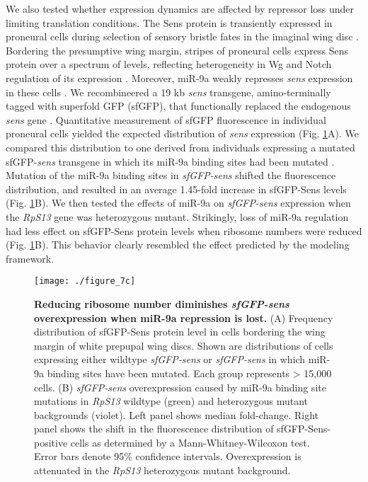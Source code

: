 We also tested whether expression dynamics are affected by repressor loss under limiting translation conditions. The Sens protein is transiently expressed in proneural cells during selection of sensory bristle fates in the imaginal wing disc \cite{Nolo2000}. Bordering the presumptive wing margin, stripes of proneural cells express Sens protein over a spectrum of levels, reflecting heterogeneity in Wg and Notch regulation of its expression \cite{JafarNejad2006,Quan2005}. Moreover, miR-9a weakly represses \textit{sens} expression in these cells \cite{Li2006}. We recombineered a 19 kb \textit{sens} transgene, amino-terminally tagged with superfold GFP (sfGFP), that functionally replaced the endogenous \textit{sens} gene \cite{Cassidy2013,Venken2006}. Quantitative measurement of sfGFP fluorescence in individual proneural cells yielded the expected distribution of \textit{sens} expression (Fig. \ref{fig:metabolism:fig7c}A). We compared this distribution to one derived from individuals expressing a mutated sfGFP-\textit{sens} transgene in which its miR-9a binding sites had been mutated \cite{Cassidy2013}. Mutation of the miR-9a binding sites in \textit{sfGFP-sens} shifted the fluorescence distribution, and resulted in an average 1.45-fold increase in sfGFP-Sens levels (Fig. \ref{fig:metabolism:fig7c}B). We then tested the effects of miR-9a on \textit{sfGFP-sens} expression when the \textit{RpS13} gene was heterozygous mutant. Strikingly, loss of miR-9a regulation had less effect on sfGFP-Sens protein levels when ribosome numbers were reduced (Fig. \ref{fig:metabolism:fig7c}B). This behavior clearly resembled the effect predicted by the modeling framework.

\begin{figure}[h!]
\centering
\texttt{[image: ./figure\_7c]}
\caption[Reducing ribosome number diminishes \textit{sfGFP-sens} overexpression.]{\textbf{Reducing ribosome number diminishes \textit{sfGFP-sens} overexpression when miR-9a repression is lost.} (A) Frequency distribution of sfGFP-Sens protein level in cells bordering the wing margin of white prepupal wing discs. Shown are distributions of cells expressing either wildtype \textit{sfGFP-sens} or \textit{sfGFP-sens} in which miR-9a binding sites have been mutated. Each group represents \textgreater{} 15,000 cells. (B) \textit{sfGFP-sens} overexpression caused by miR-9a binding site mutations in \textit{RpS13} wildtype (green) and heterozygous mutant backgrounds (violet). Left panel shows median fold-change. Right panel shows the shift in the fluorescence distribution of sfGFP-Sens-positive cells as determined by a Mann-Whitney-Wilcoxon test. Error bars denote 95\% confidence intervals. Overexpression is attenuated in the \textit{RpS13} heterozygous mutant background.}
\label{fig:metabolism:fig7c}
\end{figure}

